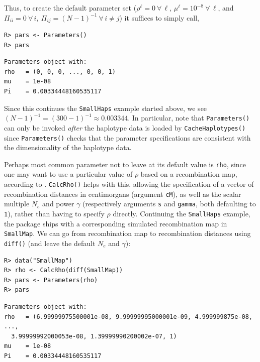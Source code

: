 \documentclass[a4paper]{article}
\begin{document}
Thus, to create the default parameter set (\(\rho^\ell = 0 \ \forall\,\ell\), \(\mu^\ell = 10^{-8} \ \forall\,\ell\), and \(\Pi_{ii} = 0 \ \forall\,i, \ \Pi_{ij} = (N-1)^{-1} \ \forall\,i \ne j\)) it suffices to simply call,

\begin{verbatim}
R> pars <- Parameters()
R> pars
\end{verbatim}
\begin{verbatim}
Parameters object with:
rho   = (0, 0, 0, ..., 0, 0, 1)
mu    = 1e-08
Pi    = 0.00334448160535117
\end{verbatim}

Since this continues the \texttt{SmallHaps} example started above, we see \((N-1)^{-1} = (300-1)^{-1} \approx 0.003344\).
In particular, note that \texttt{Parameters()} can only be invoked \emph{after} the haplotype data is loaded by \texttt{CacheHaplotypes()} since \texttt{Parameters()} checks that the parameter specifications are consistent with the dimensionality of the haplotype data.

Perhaps most common parameter not to leave at its default value is \texttt{rho}, since one may want to use a particular value of \(\rho\) based on a recombination map, according to .
\texttt{CalcRho()} helps with this, allowing the specification of a vector of recombination distances in centimorgans (argument \texttt{cM}), as well as the scalar multiple \(N_e\) and power \(\gamma\) (respectively arguments \texttt{s} and \texttt{gamma}, both defaulting to \texttt{1}), rather than having to specify \(\rho\) directly.
Continuing the \texttt{SmallHaps} example, the package ships with a corresponding simulated recombination map in \texttt{SmallMap}.
We can go from recombination map to recombination distances using \texttt{diff()} (and leave the default \(N_e\) and \(\gamma\)):

\begin{verbatim}
R> data("SmallMap")
R> rho <- CalcRho(diff(SmallMap))
R> pars <- Parameters(rho)
R> pars
\end{verbatim}
\begin{verbatim}
Parameters object with:
rho   = (6.99999975500001e-08, 9.99999995000001e-09, 4.999999875e-08, ...,
  3.99999992000053e-08, 1.39999990200002e-07, 1)
mu    = 1e-08
Pi    = 0.00334448160535117
\end{verbatim}
\end{document}
